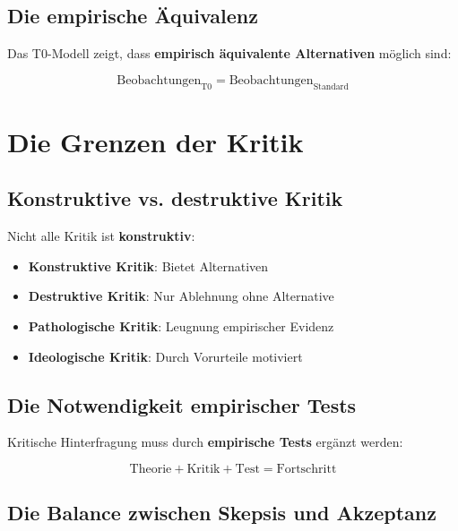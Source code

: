 \documentclass[12pt,a4paper]{report}
\begin{document}
	\subsection{Die empirische Äquivalenz}
	
	Das T0-Modell zeigt, dass \textbf{empirisch äquivalente Alternativen} möglich sind:
	
	\begin{equation}
		\text{Beobachtungen}_{\text{T0}} = \text{Beobachtungen}_{\text{Standard}}
	\end{equation}
	
	\section{Die Grenzen der Kritik}
	
	\subsection{Konstruktive vs. destruktive Kritik}
	
	Nicht alle Kritik ist \textbf{konstruktiv}:
	
	\begin{itemize}
		\item \textbf{Konstruktive Kritik}: Bietet Alternativen
		\item \textbf{Destruktive Kritik}: Nur Ablehnung ohne Alternative
		\item \textbf{Pathologische Kritik}: Leugnung empirischer Evidenz
		\item \textbf{Ideologische Kritik}: Durch Vorurteile motiviert
	\end{itemize}
	
	\subsection{Die Notwendigkeit empirischer Tests}
	
	Kritische Hinterfragung muss durch \textbf{empirische Tests} ergänzt werden:
	
	\begin{equation}
		\text{Theorie} + \text{Kritik} + \text{Test} = \text{Fortschritt}
	\end{equation}
	
	\subsection{Die Balance zwischen Skepsis und Akzeptanz}
	
\end{document}
